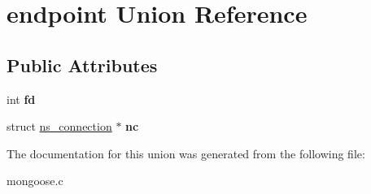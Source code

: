 \hypertarget{unionendpoint}{\section{endpoint Union Reference}
\label{unionendpoint}
}
\subsection*{Public Attributes}
\begin{DoxyCompactItemize}
\item 
\hypertarget{unionendpoint_a8833c99eb9ccdf1c870d783e52a999de}{int {\bfseries fd}}\label{unionendpoint_a8833c99eb9ccdf1c870d783e52a999de}

\item 
\hypertarget{unionendpoint_aa5b1eb8bd4b1803165496e9afc87f48a}{struct \hyperlink{structns__connection}{ns\-\_\-connection} $\ast$ {\bfseries nc}}\label{unionendpoint_aa5b1eb8bd4b1803165496e9afc87f48a}

\end{DoxyCompactItemize}


The documentation for this union was generated from the following file\-:\begin{DoxyCompactItemize}
\item 
mongoose.\-c\end{DoxyCompactItemize}
